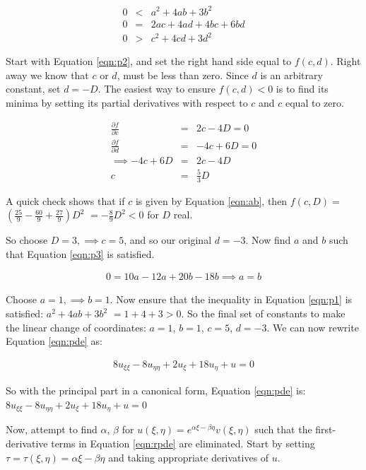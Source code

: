 \documentclass[a4paper,12pt]{article}
\begin{document}
\begin{eqnarray}
0 &<& a^2 + 4ab + 3b^2 \label{eqn:p1}\\
0 &=& 2ac + 4ad + 4bc + 6bd \label{eqn:p3}\\
0 &>& c^2 + 4cd + 3d^2 \label{eqn:p2}
\end{eqnarray}

Start with Equation \ref{eqn:p2}, and set the right hand side equal to $f(c,d)$. Right away we know that $c$ or $d$, must be less than zero. Since $d$ is an arbitrary constant, set $d = -D$. The easiest way to ensure $f(c,d) < 0$ is to find its minima by setting its partial derivatives with respect to $c$ and $c$ equal to zero.

\begin{eqnarray}
\frac{\partial f}{\partial c} &=& 2c - 4D = 0\nonumber\\
\frac{\partial f}{\partial d} &=& -4c + 6D = 0 \nonumber\\
\implies -4c + 6D &=& 2c - 4D\nonumber\\
c &=& \frac{5}{3}D\label{eqn:ab}
\end{eqnarray}

A quick check shows that if $c$ is given by Equation \ref{eqn:ab}, then $f(c,D) = $$(\frac{25}{9} - \frac{60}{9} + \frac{27}{9})D^2$ $= -\frac{8}{9}D^2 < 0$ for $D$ real.

So choose $D = 3, \implies c = 5$, and so our original $d = -3$. Now find $a$ and $b$ such that Equation \ref{eqn:p3} is satisfied.

\begin{eqnarray}
0 =  10a - 12a + 20b - 18b\implies a = b \nonumber
\end{eqnarray}

Choose $a = 1,\implies b = 1$. Now ensure that the inequality in Equation \ref{eqn:p1} is satisfied: $a^2 + 4ab + 3b^2$ $= 1 + 4 + 3 > 0$. So the final set of constants to make the linear change of coordinates: $a = 1$, $b = 1$, $c = 5$, $d = -3$. We can now rewrite Equation \ref{eqn:pde} as:

\begin{eqnarray}
8u_{\xi\xi} - 8u_{\eta\eta} + 2u_{\xi} + 18u_{\eta} + u = 0\label{eqn:rpde}
\end{eqnarray}

So with the principal part in a canonical form, Equation \ref{eqn:pde} is: $\boxed{8u_{\xi\xi} - 8u_{\eta\eta} + 2u_{\xi} + 18u_{\eta} + u = 0}$

Now, attempt to find $\alpha,\,\beta$ for $u(\xi,\eta) = e^{\alpha\xi - \beta\eta}v(\xi,\eta)$ such that the first-derivative terms in Equation \ref{eqn:rpde} are eliminated. Start by setting $\tau =\tau(\xi,\eta)= \alpha\xi - \beta\eta$ and taking appropriate derivatives of $u$.
\end{document}
